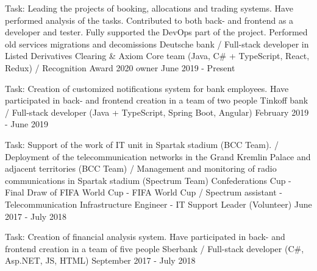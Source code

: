 

\vspace{0cm}\begin{cventries}
\cventry
{Task: Leading the projects of booking, allocations and trading systems. Have performed analysis of the tasks. Contributed to both back- and frontend as a developer and tester. Fully supported the DevOps part of the project.	Performed old services migrations and decomissions
} %
{Deutsche bank / Full-stack developer in Listed Derivatives Clearing \& Axiom Core team (Java, C\# + TypeScript, React, Redux) / Recognition Award 2020 owner} %
{} %
{June 2019 - Present} %
\noindent	
	
\cventry
{Task: Creation of customized notifications system for bank employees. Have participated in back- and frontend creation in a team of two people} %
{Tinkoff bank / Full-stack developer (Java + TypeScript, Spring Boot, Angular)} %
{} %
{February 2019 - June 2019} %
\noindent	
	
\cventry
{Task: Support of the work of IT unit in Spartak stadium (BCC Team). /
Deployment of the telecommunication networks in the Grand Kremlin Palace and adjacent territories (BCC Team) /
Management and monitoring of radio communications in Spartak stadium (Spectrum Team)} %
{Confederations Cup - Final Draw of FIFA World Cup - FIFA World Cup / 
	Spectrum assistant - Telecommunication Infrastructure Engineer  - IT Support Leader (Volunteer)} %
{} %
{June 2017 - July 2018} %
\noindent	

\cventry
{Task: Creation of financial analysis system. Have participated in back- and frontend creation in a team of five people} %
{Sberbank / Full-stack developer (C\#, Asp.NET, JS, HTML)} %
{} %
{September 2017 - July 2018} %
\noindent	




\end{cventries}
